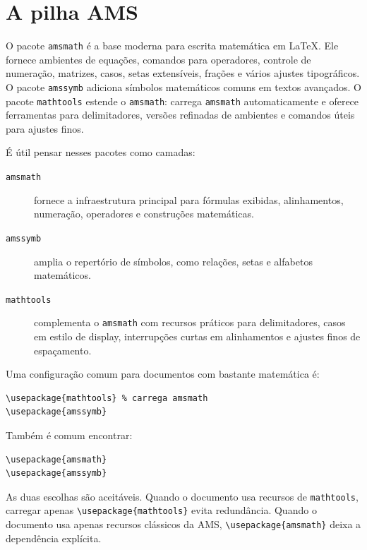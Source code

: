 \section{A pilha AMS}

O pacote \texttt{amsmath} é a base moderna para escrita matemática em \LaTeX. Ele fornece ambientes de equações, comandos para operadores, controle de numeração, matrizes, casos, setas extensíveis, frações e vários ajustes tipográficos. O pacote \texttt{amssymb} adiciona símbolos matemáticos comuns em textos avançados. O pacote \texttt{mathtools} estende o \texttt{amsmath}: carrega \texttt{amsmath} automaticamente e oferece ferramentas para delimitadores, versões refinadas de ambientes e comandos úteis para ajustes finos.

É útil pensar nesses pacotes como camadas:

\begin{description}
    \item[\texttt{amsmath}] fornece a infraestrutura principal para fórmulas exibidas, alinhamentos, numeração, operadores e construções matemáticas.
    \item[\texttt{amssymb}] amplia o repertório de símbolos, como relações, setas e alfabetos matemáticos.
    \item[\texttt{mathtools}] complementa o \texttt{amsmath} com recursos práticos para delimitadores, casos em estilo de display, interrupções curtas em alinhamentos e ajustes finos de espaçamento.
\end{description}

Uma configuração comum para documentos com bastante matemática é:

\begin{lstlisting}[language={[latex]TeX}, caption={Pacotes para escrita matemática}]
\usepackage{mathtools} % carrega amsmath
\usepackage{amssymb}
\end{lstlisting}

Também é comum encontrar:

\begin{lstlisting}[language={[latex]TeX}, caption={Carregamento explícito de amsmath}]
\usepackage{amsmath}
\usepackage{amssymb}
\end{lstlisting}

As duas escolhas são aceitáveis. Quando o documento usa recursos de \texttt{mathtools}, carregar apenas \verb|\usepackage{mathtools}| evita redundância. Quando o documento usa apenas recursos clássicos da AMS, \verb|\usepackage{amsmath}| deixa a dependência explícita.

